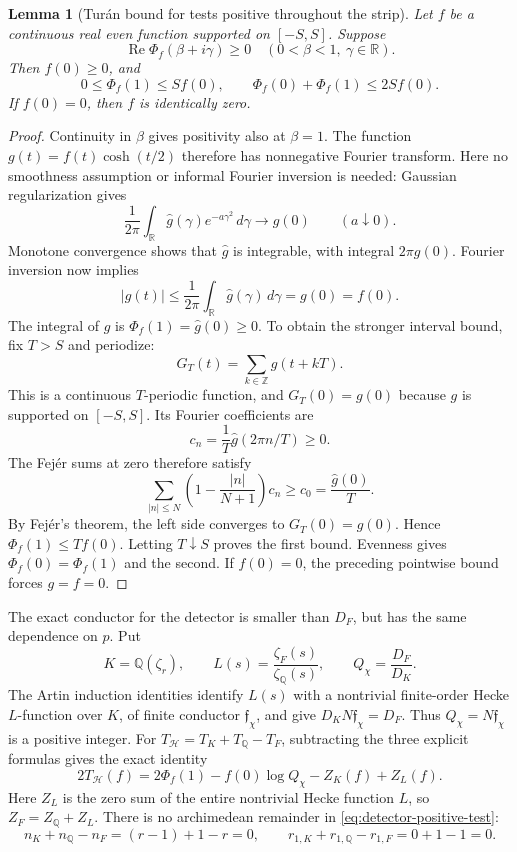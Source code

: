 \documentclass[11pt]{article}
\newtheorem{lemma}[theorem]{Lemma}
\theoremstyle{definition}
\theoremstyle{remark}
\begin{document}
\begin{lemma}[Tur\'an bound for tests positive throughout the strip]
\label{lem:strip-positive-barrier}
Let $f$ be a continuous real even function supported on $[-S,S]$.
Suppose
\[
 \operatorname{Re}\Phi_f(\beta+i\gamma)\geq0
 \quad(0<\beta<1,\ \gamma\in\mathbb R).
\]
Then $f(0)\geq0$, and
\begin{equation}\label{eq:strip-positive-pole-bound}
 0\leq\Phi_f(1)\leq Sf(0),
 \qquad
 \Phi_f(0)+\Phi_f(1)\leq2Sf(0).
\end{equation}
If $f(0)=0$, then $f$ is identically zero.
\end{lemma}
\begin{proof}
Continuity in $\beta$ gives positivity also at $\beta=1$.
The function $g(t)=f(t)\cosh(t/2)$ therefore has nonnegative
Fourier transform.  Here no smoothness assumption or informal
Fourier inversion is needed: Gaussian regularization gives
\[
 \frac1{2\pi}\int_{\mathbb R}\widehat g(\gamma)
                           e^{-a\gamma^2}\,d\gamma
      \longrightarrow g(0)\qquad(a\downarrow0).
\]
Monotone convergence shows that $\widehat g$ is integrable,
with integral $2\pi g(0)$.  Fourier inversion now implies
\[
 |g(t)|\leq\frac1{2\pi}\int_{\mathbb R}
                   \widehat g(\gamma)\,d\gamma=g(0)=f(0).
\]
The integral of $g$ is $\Phi_f(1)=\widehat g(0)\geq0$.
To obtain the stronger interval bound, fix $T>S$ and periodize:
\[
 G_T(t)=\sum_{k\in\mathbb Z}g(t+kT).
\]
This is a continuous $T$-periodic function, and
$G_T(0)=g(0)$ because $g$ is supported on $[-S,S]$.
Its Fourier coefficients are
\[
 c_n=\frac1T\widehat g(2\pi n/T)\geq0.
\]
The Fej\'er sums at zero therefore satisfy
\[
 \sum_{|n|\leq N}\left(1-\frac{|n|}{N+1}\right)c_n
       \geq c_0=\frac{\widehat g(0)}T.
\]
By Fej\'er's theorem, the left side converges to
$G_T(0)=g(0)$.  Hence $\Phi_f(1)\leq Tf(0)$.
Letting $T\downarrow S$ proves the first bound.
Evenness gives $\Phi_f(0)=\Phi_f(1)$ and the second.
If $f(0)=0$, the preceding pointwise bound forces $g=f=0$.
\end{proof}

The exact conductor for the detector is smaller than $D_F$,
but has the same dependence on $p$.  Put
\[
 K=\mathbb Q(\zeta_r),\qquad
 L(s)=\frac{\zeta_F(s)}{\zeta_{\mathbb Q}(s)},\qquad
 Q_\chi=\frac{D_F}{D_K}.
\]
The Artin induction identities identify $L(s)$ with a nontrivial
finite-order Hecke $L$-function over $K$, of finite conductor
$\mathfrak f_\chi$, and give
$D_KN\mathfrak f_\chi=D_F$.
Thus $Q_\chi=N\mathfrak f_\chi$ is a positive integer.
For $T_{\mathcal H}=T_K+T_{\mathbb Q}-T_F$,
subtracting the three explicit formulas gives the exact identity
\begin{equation}\label{eq:detector-positive-test}
 \boxed{
 2T_{\mathcal H}(f)
   =2\Phi_f(1)-f(0)\log Q_\chi-Z_K(f)+Z_L(f).
 }
\end{equation}
Here $Z_L$ is the zero sum of the entire nontrivial Hecke function
$L$, so $Z_F=Z_{\mathbb Q}+Z_L$.
There is no archimedean remainder in
\eqref{eq:detector-positive-test}:
\[
 n_K+n_{\mathbb Q}-n_F=(r-1)+1-r=0,
 \qquad
 r_{1,K}+r_{1,\mathbb Q}-r_{1,F}=0+1-1=0.
\]
\end{document}
